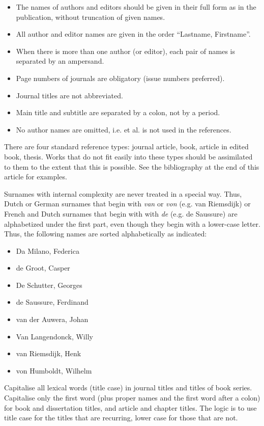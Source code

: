 \documentclass[charis,linguex]{glossa}
\begin{document}
\begin{itemize}
\item The names of authors and editors should be given in their full form as in the publication, without truncation of given names.
\item All author and editor names are given in the order ``Lastname, Firstname''.
\item When there is more than one author (or editor), each pair of names is separated by an ampersand.
\item Page numbers of journals are obligatory (issue numbers preferred).
\item Journal titles are not abbreviated.
\item Main title and subtitle are separated by a colon, not by a period.
\item No author names are omitted, i.e. et al. is not used in the references.
\end{itemize}

There are four standard reference types: journal article, book, article in edited book, thesis. Works that do not fit easily into these types should be assimilated to them to the extent that this is possible. See the bibliography at the end of this article for examples.

Surnames with internal complexity are never treated in a special way. Thus, Dutch or German surnames that begin with \textit{van} or \textit{von} (e.g. van Riemsdijk) or French and Dutch surnames that begin with with \textit{de} (e.g. de Saussure) are alphabetized under the first part, even though they begin with a lower-case letter. Thus, the following names are sorted alphabetically as indicated:

\begin{itemize}
\item Da Milano, Federica
\item de Groot, Casper
\item De Schutter, Georges
\item de Saussure, Ferdinand
\item van der Auwera, Johan
\item Van Langendonck, Willy
\item van Riemsdijk, Henk
\item von Humboldt, Wilhelm
\end{itemize}

Capitalise all lexical words (title case) in journal titles and titles of book series. Capitalise only the first word (plus proper names and the first word after a colon) for book and dissertation titles, and article and chapter titles. The logic is to use title case for the titles that are recurring, lower case for those that are not.
\end{document}
